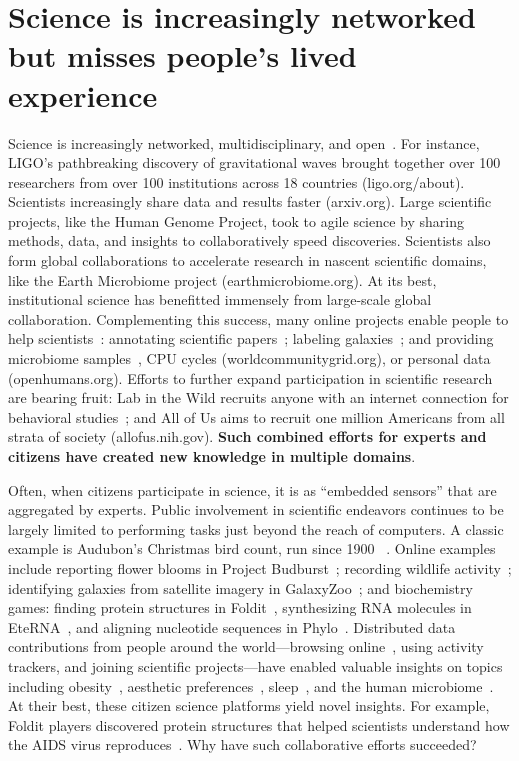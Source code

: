 \section{Science is increasingly networked but misses people’s lived experience }
Science is increasingly networked, multidisciplinary, and
open~\cite{Pandey2017}. For instance, LIGO’s pathbreaking discovery of
gravitational waves brought together over 100 researchers
from over 100 institutions across 18 countries (ligo.org/about). 
Scientists increasingly share data and results faster (arxiv.org). 
Large scientific projects, like the Human Genome Project, 
took to agile science by sharing methods, data, and insights to 
collaboratively speed discoveries. Scientists also form global 
collaborations to accelerate research in nascent scientific domains, 
like the Earth Microbiome project (earthmicrobiome.org).
At its best, institutional science has benefitted immensely
from large-scale global collaboration. Complementing this success,
many online projects enable people to help scientists~\cite{Nielsen2012}: annotating 
scientific papers~\cite{Good2013}; labeling galaxies~\cite{JordanRaddick2013}; and providing microbiome 
samples~\cite{McDonald2018}, CPU cycles (worldcommunitygrid.org), or personal data (openhumans.org). 
Efforts to further expand participation in scientific research are bearing fruit: Lab in the Wild 
recruits anyone with an internet connection for behavioral studies~\cite{Reinecke2015}; and All of Us aims 
to recruit one million Americans from all strata of society (allofus.nih.gov). \textbf{Such combined efforts for experts 
and citizens have created new knowledge in multiple domains}.

Often, when citizens participate in science, it is as “embedded sensors” that 
are aggregated by experts. Public involvement in scientific endeavors continues
to be largely limited to performing tasks just beyond the reach of computers.
A classic example is Audubon’s Christmas bird count, run since 1900
~\cite{Audubon2016}. Online examples include reporting flower blooms in
Project Budburst~\cite{BoulderColorado2016}; recording wildlife activity~\cite{Faridani2009a};
identifying galaxies from satellite imagery in GalaxyZoo~\cite{Zooniverse2007}; 
and biochemistry games: finding protein structures in Foldit~\cite{Cooper2010}, 
synthesizing RNA molecules in EteRNA~\cite{Lee2014}, and aligning 
nucleotide sequences in Phylo~\cite{Kawrykow2012}. Distributed 
data contributions from people around the world—browsing online~\cite{Coviello2014}, using activity trackers, and joining scientific projects—have enabled valuable insights on topics including 
obesity~\cite{Althoff2017}, aesthetic preferences~\cite{Reinecke2014a}, sleep~\cite{F.lux2019}, and the human microbiome~\cite{McDonald2018a}. At their
best, these citizen science platforms yield novel insights.
For example, Foldit players discovered protein structures
that helped scientists understand how the AIDS virus reproduces~\cite{Coren2011}. Why have such collaborative efforts succeeded?


